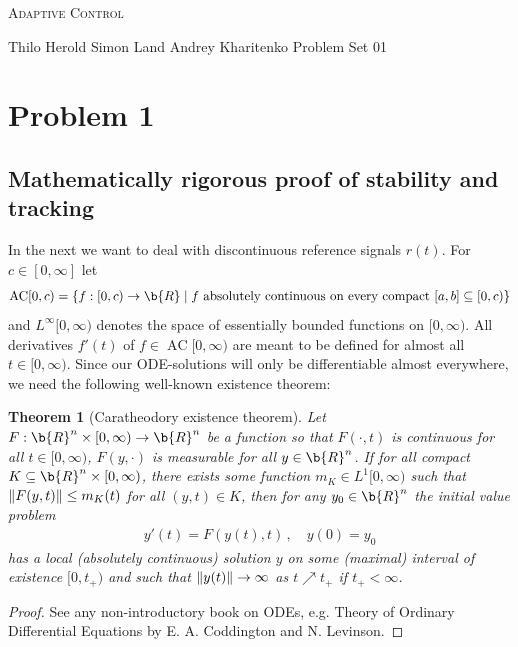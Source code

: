 \documentclass[12pt,a4paper]{article}
\newtheorem{theorem}{Theorem}
\DeclarePairedDelimiter{\norm}{\lVert}{\rVert}
\DeclareMathOperator{\AC}{AC}
\begin{document}
	\begin{center}
		\Large \textsc{Adaptive Control}
	\end{center}

	Thilo Herold \hfill Simon Land \hfill Andrey Kharitenko \hfill Problem Set 01

	\section*{Problem 1}
	
	\subsection*{Mathematically rigorous proof of stability and tracking}
	
	In the next we want to deal with discontinuous reference signals $r(t)$.
	For $c \in [0,\infty]$ let
	\begin{align*}
		\AC[0,c)
		= \{f:[0,c) \to \b{R} \mid f \text{ absolutely continuous on every compact }[a,b] \subseteq [0,c)\}
	\end{align*}
	and $L^\infty[0,\infty)$ denotes the space of essentially bounded functions on $[0,\infty)$.
	All derivatives $f'(t)$ of $f \in \AC[0,\infty)$ are meant to be defined for almost all $t \in [0,\infty)$.
	Since our ODE-solutions will only be differentiable almost everywhere, we need the following well-known existence theorem:
	\begin{theorem}[Caratheodory existence theorem]
		Let $F:\b{R}^n \times [0,\infty) \to \b{R}^n$ be a function so that $F(\cdot,t)$ is continuous for all $t \in [0,\infty)$, $F(y,\cdot)$ is measurable for all $y \in \b{R}^n$. 
		If for all compact $K \subseteq \b{R}^n \times [0,\infty)$, there exists some function $m_K \in L^1[0,\infty)$ such that $\norm{F(y,t)} \leq m_K(t)$ for all $(y,t) \in K$, then for any $y_0\in \b{R}^n$ the initial value problem
		\begin{align*}
			y'(t) = F(y(t),t)\,, \quad
			y(0) = y_0 
		\end{align*}
		has a local (absolutely continuous) solution $y$ on some (maximal) interval of existence $[0,t_+)$ and such that $\norm{y(t)} \to \infty$ as $t \nearrow t_+$ if $t_+ < \infty$.
	\end{theorem}
	\begin{proof}[Proof]
		See any non-introductory book on ODEs, e.g. Theory of Ordinary Differential Equations by E. A. Coddington and N. Levinson.
	\end{proof}
\end{document}
